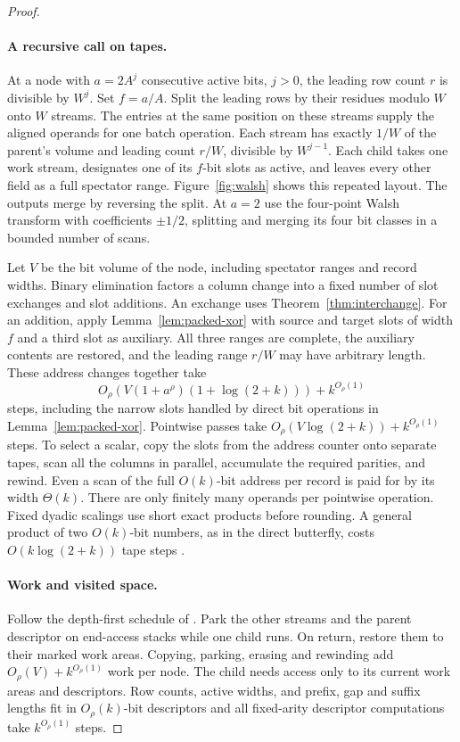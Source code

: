\begin{proof}
\paragraph{A recursive call on tapes.}
At a node with \(a=2A^j\) consecutive active bits, \(j>0\), the
leading row count \(r\) is divisible by \(W^j\). Set \(f=a/A\).
Split the leading rows by their residues modulo \(W\) onto \(W\)
streams. The entries at the same position on these streams supply the
aligned operands for one batch operation. Each stream has exactly
\(1/W\) of the parent's volume and leading count \(r/W\), divisible
by \(W^{j-1}\). Each child takes one work stream, designates one of
its \(f\)-bit slots as active, and leaves every other field as a full
spectator range. Figure~\ref{fig:walsh} shows this repeated layout.
The outputs merge by reversing the split. At \(a=2\) use the
four-point Walsh transform with coefficients \(\pm1/2\), splitting
and merging its four bit classes in a bounded number of scans.



Let \(V\) be the bit volume of the node, including spectator ranges
and record widths. Binary elimination factors a column change into
a fixed number of slot exchanges and slot additions. An exchange uses
Theorem~\ref{thm:interchange}. For an addition, apply
Lemma~\ref{lem:packed-xor} with source and target slots of width \(f\)
and a third slot as auxiliary. All three ranges are complete, the
auxiliary contents are restored, and the leading range \(r/W\) may
have arbitrary length. These address changes together take
\[
 O_\rho\!\left(V(1+a^\rho)(1+\log(2+k))\right)+k^{O_\rho(1)}
\]
steps, including the narrow slots handled by direct bit operations
in Lemma~\ref{lem:packed-xor}. Pointwise passes take
\(O_\rho(V\log(2+k))+k^{O_\rho(1)}\) steps. To select a scalar, copy
the slots from the address counter onto separate tapes, scan all the
columns in parallel, accumulate the required parities, and rewind.
Even a scan of the full \(O(k)\)-bit address per record is paid for
by its width \(\Theta(k)\). There are only finitely many operands per
pointwise operation. Fixed dyadic scalings use short exact products
before rounding. A general product of two \(O(k)\)-bit numbers, as
in the direct butterfly, costs \(O(k\log(2+k))\) tape steps \cite{hvh}.

\paragraph{Work and visited space.}
Follow the depth-first schedule of \cite[Proposition~11]{Tape}.
Park the other streams and the parent descriptor on end-access stacks
while one child runs. On return, restore them to their marked work
areas. Copying, parking, erasing and rewinding add
\(O_\rho(V)+k^{O_\rho(1)}\) work per node. The child needs access only
to its current work areas and descriptors. Row counts, active widths,
and prefix, gap and suffix lengths fit in \(O_\rho(k)\)-bit descriptors
and all fixed-arity descriptor computations take \(k^{O_\rho(1)}\)
steps.


\end{proof}
